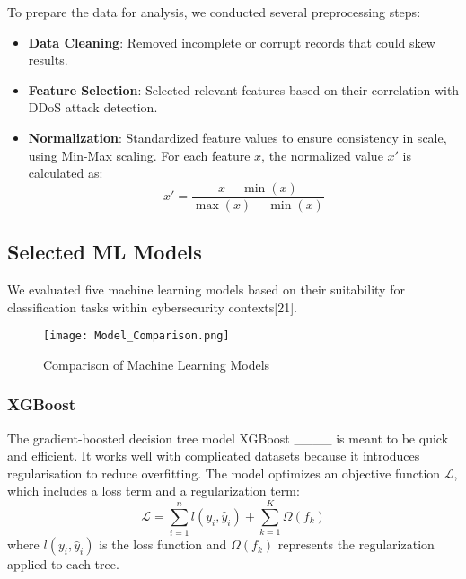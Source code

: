\vspace{\baselineskip}
To prepare the data for analysis, we conducted several preprocessing steps:
\begin{itemize}
    \item \textbf{Data Cleaning}: Removed incomplete or corrupt records that could skew results.
    \vspace{\baselineskip}
    \item \textbf{Feature Selection}: Selected relevant features based on their correlation with DDoS attack detection.
    \vspace{\baselineskip}
    \item \textbf{Normalization}: Standardized feature values to ensure consistency in scale, using Min-Max scaling. For each feature \(x\), the normalized value \(x'\) is calculated as:
    \begin{equation}
        x' = \frac{x - \min(x)}{\max(x) - \min(x)}
    \end{equation}
\end{itemize}

\subsection{Selected ML Models}
We evaluated five machine learning models based on their suitability for classification tasks within cybersecurity contexts[21].

\begin{figure}[H]
\centering
\texttt{[image: Model\_Comparison.png]}
\caption{Comparison of Machine Learning Models}
\label{fig:model_comparison}
\end{figure}


\subsubsection{\textbf{XGBoost}}
The gradient-boosted decision tree model XGBoost ____ is meant to be quick and efficient. It works well with complicated datasets because it introduces regularisation to reduce overfitting. The model optimizes an objective function \( \mathcal{L} \), which includes a loss term and a regularization term:
\begin{equation}
    \mathcal{L} = \sum_{i=1}^{n} l(y_i, \hat{y}_i) + \sum_{k=1}^{K} \Omega(f_k)
\end{equation}
where \( l(y_i, \hat{y}_i) \) is the loss function and \( \Omega(f_k) \) represents the regularization applied to each tree.

